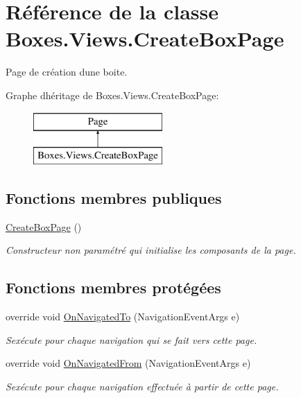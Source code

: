 \hypertarget{class_boxes_1_1_views_1_1_create_box_page}{}\section{Référence de la classe Boxes.\+Views.\+Create\+Box\+Page}
\label{class_boxes_1_1_views_1_1_create_box_page}


Page de création d\textquotesingle{}une boite.  


Graphe d\textquotesingle{}héritage de Boxes.\+Views.\+Create\+Box\+Page\+:\begin{figure}[H]
\begin{center}
\leavevmode
\includegraphics[height=2.000000cm]{class_boxes_1_1_views_1_1_create_box_page}
\end{center}
\end{figure}
\subsection*{Fonctions membres publiques}
\begin{DoxyCompactItemize}
\item 
\hyperlink{class_boxes_1_1_views_1_1_create_box_page_a60d3ce23cdcffe93aa5424b99efe6407}{Create\+Box\+Page} ()
\begin{DoxyCompactList}\small\item\em Constructeur non paramétré qui initialise les composants de la page. \end{DoxyCompactList}\end{DoxyCompactItemize}
\subsection*{Fonctions membres protégées}
\begin{DoxyCompactItemize}
\item 
override void \hyperlink{class_boxes_1_1_views_1_1_create_box_page_ad5510f2534ae14034e9587fcc3077033}{On\+Navigated\+To} (Navigation\+Event\+Args e)
\begin{DoxyCompactList}\small\item\em S\textquotesingle{}exécute pour chaque navigation qui se fait vers cette page. \end{DoxyCompactList}\item 
override void \hyperlink{class_boxes_1_1_views_1_1_create_box_page_af079e350fd2e497517353011bbfc8c9f}{On\+Navigated\+From} (Navigation\+Event\+Args e)
\begin{DoxyCompactList}\small\item\em S\textquotesingle{}exécute pour chaque navigation effectuée à partir de cette page. \end{DoxyCompactList}\end{DoxyCompactItemize}
